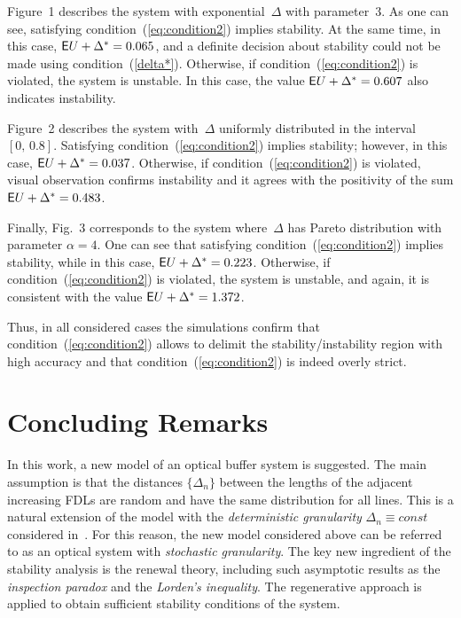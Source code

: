 \begin{multicols}{2}
Figure~1 describes  the system with exponential~$\Delta$ with 
parameter~$3$. As one can see, satisfying condition~(\ref{eq:condition2}) implies 
stability. At the same time, in  this case, ${\sf E} U + \Delta^* = 0.065$, and 
a definite decision about stability   could not be made using condition~(\ref{delta*}). 
Otherwise, if condition~(\ref{eq:condition2}) is violated, the 
system is unstable. In this case, the value  ${\sf E} U + \Delta^* = 0.607$ 
also indicates instability.


Figure~2 describes  the system with~$\Delta$ uniformly distributed 
in  the interval $[0,\, 0.8]$.  { Satisfying condition~(\ref{eq:condition2}) implies 
stability; however, in this  case, ${\sf E} U + \Delta^* = 0.037$. Otherwise, if 
 condition~(\ref{eq:condition2}) is violated, visual observation confirms 
instability and it agrees with  the positivity of the sum  ${\sf E} U + 
\Delta^* = 0.483$.}

Finally, Fig.~3 corresponds to the system where~$\Delta$ has 
Pareto distribution  with parameter $\alpha = 4$. One can see that satisfying 
condition~(\ref{eq:condition2}) implies stability,   while in  this case, ${\sf E} 
U + \Delta^* = 0.223$. Otherwise, if condition~(\ref{eq:condition2}) is violated, 
the system is unstable, and again, it is consistent with the value  ${\sf E} U + 
\Delta^* = 1.372$.
{

}


 Thus, in all considered cases the simulations  confirm   that
condition~(\ref{eq:condition2}) allows to delimit  the
stability/instability region with high accuracy and that condition~(\ref{eq:condition2}) 
is indeed overly strict.

\section{Concluding Remarks}
\setcounter{section}{4} 

\noindent
In this work, a new model of an optical
buffer system is suggested.  The main assumption is that the
distances $\{\Delta_n\}$ between the lengths of the adjacent
increasing FDLs are random and have the same distribution for all
lines. This is a natural extension of the model with the {\it
deterministic granularity}  $\Delta_n\equiv const$ considered in~\cite{Call}. For this reason, the new model considered above
 can be referred to as an optical system with {\it
stochastic granularity}. The key new ingredient of the stability
analysis  is the renewal theory, including such asymptotic results as
the {\it inspection paradox} and the {\it Lorden's inequality}.
The regenerative approach is applied to obtain sufficient stability
conditions of the system.


\end{multicols}
